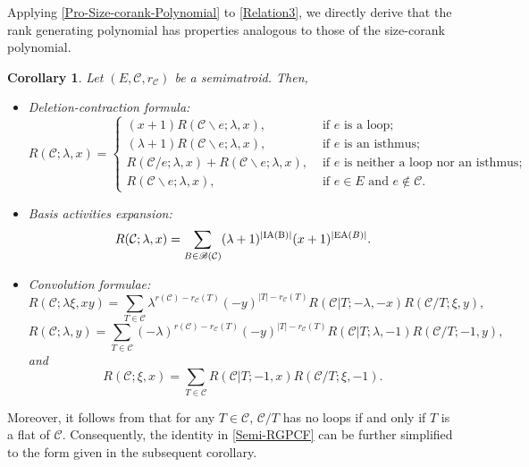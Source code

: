 \documentclass[12pt]{article}%
\numberwithin{equation}{section}
\newtheorem{corollary}[corollary]{Corollary}
\begin{document}
Applying \autoref{Pro-Size-corank-Polynomial} to \eqref{Relation3}, we directly derive that the rank generating polynomial has properties analogous to those of the size-corank polynomial.
\begin{corollary}\label{Prop-Rank-Polynomial}
Let $(E,\mathcal{C},r_{\mathcal{C}})$ be a semimatroid. Then,
\begin{itemize}
\item[\rm{(1)}] Deletion-contraction formula:
\[
R(\mathcal{C};\lambda,x)=
\begin{cases}
(x+1)R(\mathcal{C}\backslash e;\lambda,x),&\text{ if } e \text{ is a loop};\\
(\lambda+1)R(\mathcal{C}\backslash e;\lambda,x),&\text{ if } e \text{ is an isthmus};\\
R(\mathcal{C}/e;\lambda,x)+R(\mathcal{C}\backslash e;\lambda,x),&\text{ if } e \text{ is neither a loop nor an isthmus};\\
R(\mathcal{C}\backslash e;\lambda,x),&\text{ if } e\in E \text{ and } e\notin\mathcal{C}.
\end{cases}
\]
\item[\rm{(2)}] Basis activities expansion:
\[
R(\mathcal{C};\lambda,x)=\sum_{B\in\mathscr{B}(\mathcal{C})}(\lambda+1)^{|{\rm IA(B)}|}(x+1)^{|{\rm EA}(B)|}.
\]
\item[\rm{(3)}] Convolution formulae: 
\[
R(\mathcal{C};\lambda\xi,xy)=\sum_{T\in\mathcal{C}}\lambda^{r(\mathcal{C})-r_{\mathcal{C}}(T)}(-y)^{|T|-r_\mathcal{C}(T)}
R(\mathcal{C}|T;-\lambda,-x)R(\mathcal{C}/T;\xi,y),
\]
\[
R(\mathcal{C};\lambda,y)=\sum_{T\in\mathcal{C}}(-\lambda)^{r(\mathcal{C})-r_{\mathcal{C}}(T)}(-y)^{|T|-r_\mathcal{C}(T)}
R(\mathcal{C}|T;\lambda,-1)R(\mathcal{C}/T;-1,y),
\]
and
\begin{equation}\label{Semi-RGPCF}
R(\mathcal{C};\xi,x)=\sum_{T\in\mathcal{C}}R(\mathcal{C}|T;-1,x)R(\mathcal{C}/T;\xi,-1).
\end{equation}
\end{itemize}
\end{corollary}

Moreover, it follows from \cite[Lemma 3.6]{Fu2025} that for any $T\in\mathcal{C}$, $\mathcal{C}/T$ has no loops if and only if $T$ is a flat of $\mathcal{C}$. Consequently, the identity in \eqref{Semi-RGPCF} can be further simplified to the form given in the subsequent corollary.
\end{document}
